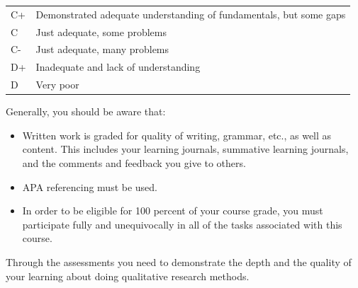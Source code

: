 \documentclass[]{book}
\providecommand{\tightlist}{%
  \setlength{\itemsep}{0pt}\setlength{\parskip}{0pt}}
\theoremstyle{definition}
\theoremstyle{definition}
\theoremstyle{definition}
\theoremstyle{remark}
\begin{document}
\begin{longtable}[]{@{}ll@{}}
\begin{minipage}[t]{0.08\columnwidth}
C+\strut
\end{minipage} & \begin{minipage}[t]{0.86\columnwidth}\raggedright
Demonstrated adequate understanding of fundamentals, but some gaps\strut
\end{minipage}\tabularnewline
\begin{minipage}[t]{0.08\columnwidth}\raggedright
C\strut
\end{minipage} & \begin{minipage}[t]{0.86\columnwidth}\raggedright
Just adequate, some problems\strut
\end{minipage}\tabularnewline
\begin{minipage}[t]{0.08\columnwidth}\raggedright
C-\strut
\end{minipage} & \begin{minipage}[t]{0.86\columnwidth}\raggedright
Just adequate, many problems\strut
\end{minipage}\tabularnewline
\begin{minipage}[t]{0.08\columnwidth}\raggedright
D+\strut
\end{minipage} & \begin{minipage}[t]{0.86\columnwidth}\raggedright
Inadequate and lack of understanding\strut
\end{minipage}\tabularnewline
\begin{minipage}[t]{0.08\columnwidth}\raggedright
D\strut
\end{minipage} & \begin{minipage}[t]{0.86\columnwidth}\raggedright
Very poor\strut
\end{minipage}\tabularnewline
\bottomrule
\end{longtable}

Generally, you should be aware that:

\begin{itemize}
\tightlist
\item
  Written work is graded for quality of writing, grammar, etc., as well
  as content. This includes your learning journals, summative learning
  journals, and the comments and feedback you give to others.
\item
  APA referencing must be used.
\item
  In order to be eligible for 100 percent of your course grade, you must
  participate fully and unequivocally in all of the tasks associated
  with this course.
\end{itemize}

Through the assessments you need to demonstrate the depth and the
quality of your learning about doing qualitative research methods.
\end{document}
